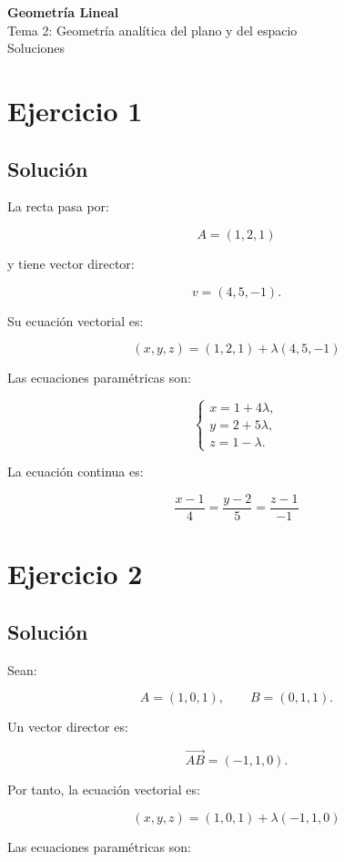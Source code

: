 \documentclass[11pt,a4paper]{article}
\begin{document}
\begin{center}
{\LARGE\bfseries Geometría Lineal}\\[0.4em]
{\Large Tema 2: Geometría analítica del plano y del espacio}\\[0.4em]
{\large Soluciones}
\end{center}

\section{Ejercicio 1}
\subsection{Solución}

La recta pasa por:

\[
A=(1,2,1)
\]

y tiene vector director:

\[
v=(4,5,-1).
\]

Su ecuación vectorial es:

\[
\boxed{
(x,y,z)
=
(1,2,1)
+
\lambda(4,5,-1)
}
\]

Las ecuaciones paramétricas son:

\[
\boxed{
\begin{cases}
x=1+4\lambda,\\
y=2+5\lambda,\\
z=1-\lambda.
\end{cases}
}
\]

La ecuación continua es:

\[
\boxed{
\frac{x-1}{4}
=
\frac{y-2}{5}
=
\frac{z-1}{-1}
}
\]

\section{Ejercicio 2}
\subsection{Solución}

Sean:

\[
A=(1,0,1),
\qquad
B=(0,1,1).
\]

Un vector director es:

\[
\overrightarrow{AB}
=
(-1,1,0).
\]

Por tanto, la ecuación vectorial es:

\[
\boxed{
(x,y,z)
=
(1,0,1)
+
\lambda(-1,1,0)
}
\]

Las ecuaciones paramétricas son:
\end{document}
